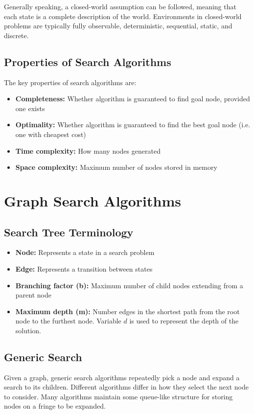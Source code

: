 \documentclass[12pt,titlepage]{article}
\begin{document}
      Generally speaking, a closed-world assumption can be followed, meaning that each state is a complete description of the world.
      Environments in closed-world problems are typically fully observable, deterministic, sequential, static, and discrete.

    \subsection{Properties of Search Algorithms}
      The key properties of search algorithms are:
      \begin{itemize}
        \item \textbf{Completeness:} Whether algorithm is guaranteed to find goal node, provided one exists
        \item \textbf{Optimality:} Whether algorithm is guaranteed to find the best goal node (i.e. one with cheapest cost)
        \item \textbf{Time complexity:} How many nodes generated
        \item \textbf{Space complexity:} Maximum number of nodes stored in memory
      \end{itemize}

  \newpage

  \section{Graph Search Algorithms}

    \subsection{Search Tree Terminology}
      \begin{itemize}
        \item \textbf{Node:} Represents a state in a search problem
        \item \textbf{Edge:} Represents a transition between states
        \item \textbf{Branching factor (b):} Maximum number of child nodes extending from a parent node
        \item \textbf{Maximum depth (m):} Number edges in the shortest path from the root node to the furthest node.
        Variable $d$ is used to represent the depth of the solution.
      \end{itemize}

    \subsection{Generic Search}
      Given a graph, generic search algorithms repeatedly pick a node and expand a search to its children. Different algorithms
      differ in how they select the next node to consider. Many algorithms maintain some queue-like structure for storing nodes
      on a fringe to be expanded.
\end{document}
